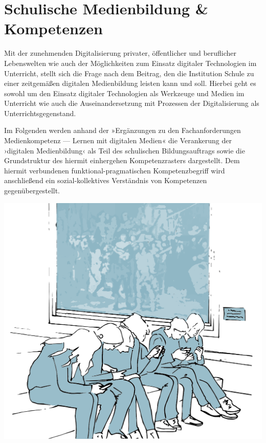 \documentclass[
  a4paper,
]{book}
\begin{document}
\chapter{Schulische Medienbildung \& Kompetenzen}\label{schulische-medienbildung-kompetenzen}

Mit der zunehmenden Digitalisierung privater, öffentlicher und beruflicher Lebenswelten wie auch der Möglichkeiten zum Einsatz digitaler Technologien im Unterricht, stellt sich die Frage nach dem Beitrag, den die Institution Schule zu einer zeitgemäßen digitalen Medienbildung leisten kann und soll. Hierbei geht es sowohl um den Einsatz digitaler Technologien als Werkzeuge und Medien im Unterricht wie auch die Auseinandersetzung mit Prozessen der Digitalisierung als Unterrichtsgegenstand.

Im Folgenden werden anhand der »Ergänzungen zu den Fachanforderungen Medienkompetenz --- Lernen mit digitalen Medien« \citep{ministeriumfurbildungwissenschaftundkulturdeslandesschleswig-holsteinErganzungenFachanforderungenMedienkompetenz2018} die Verankerung der ›digitalen Medienbildung‹ als Teil des schulischen Bildungsauftrags sowie die Grundstruktur des hiermit einhergehen Kompetenzrasters dargestellt. Dem hiermit verbundenen funktional-pragmatischen Kompetenzbegriff wird anschließend ein sozial-kollektives Verständnis von Kompetenzen gegenübergestellt.

\begin{center}\includegraphics{Figures/13-01-Kompetenz-Color} \end{center}
\end{document}
